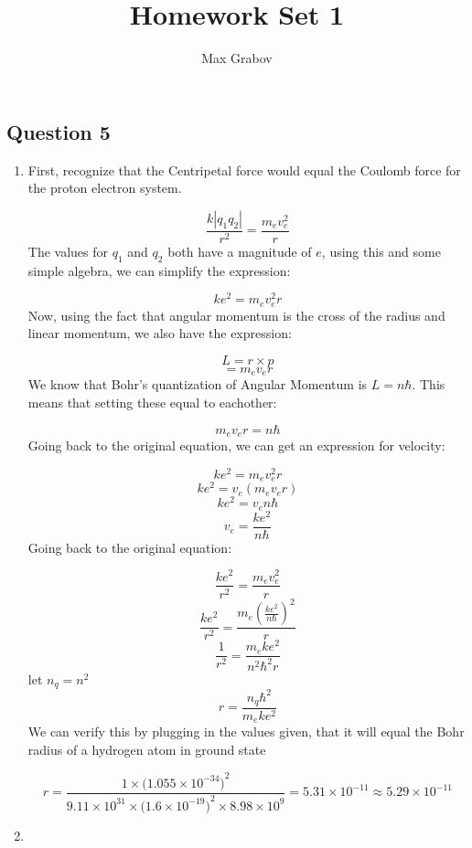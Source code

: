 \documentclass{article}
\title{Homework Set 1}
\author{Max Grabov}
\begin{document}
\maketitle

\subsection*{Question 5}
\begin{enumerate}[label=\alph*)]
\item
First, recognize that the Centripetal force would equal the Coulomb force for the proton electron system.

\[\frac{k|q_1q_2|}{r^2} = \frac{m_ev_e^2}{r}\]
The values for $q_1$ and $q_2$ both have a magnitude of $e$, using this and some simple algebra, we can simplify the expression:

\[ke^2 = m_ev_e^2r\]
Now, using the fact that angular momentum is the cross of the radius and linear momentum, we also have the expression:

\[L=r\times{p}\]
\[=m_ev_er\]
We know that Bohr's quantization of Angular Momentum is $L = n\hbar$. This means that setting these equal to eachother:

\[m_ev_er = n\hbar\]
Going back to the original equation, we can get an expression for velocity:

\[ke^2 = m_ev_e^2r\]
\[ke^2 = v_e(m_ev_er)\]
\[ke^2 = v_en\hbar\]
\[v_e = \frac{ke^2}{n\hbar}\]
Going back to the original equation:

\[\frac{ke^2}{r^2} = \frac{m_ev_e^2}{r}\]
\[\frac{ke^2}{r^2} = \frac{m_e(\frac{ke^2}{n\hbar})^2}{r}\]
\[\frac{1}{r^2} = \frac{m_eke^2}{n^2\hbar^2r}\]
let $n_q = n^2$
\[r = \frac{n_q\hbar^2}{m_eke^2}\]
We can verify this by plugging in the values given, that it will equal the Bohr radius of a hydrogen atom in ground state

\[r = \frac{1\times{(1.055\times{10^{-34})}^2}}{9.11\times{10^{31}}\times{(1.6\times{10^{-19})}^2} \times{8.98 \times{10^{9}}}} =5.31\times{10^{-11}} \approx 5.29\times{10^{-11}}\]

\item

\end{enumerate}
\end{document}
